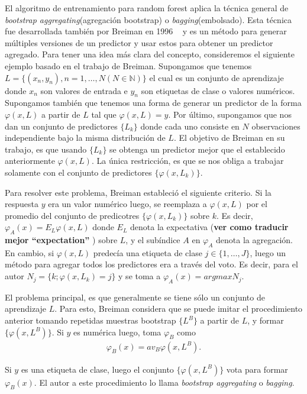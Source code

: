 	El algoritmo de entrenamiento para random forest aplica la técnica general de \textit{bootstrap aggregating}(agregación bootstrap) o \textit{bagging}(embolsado). Esta técnica fue desarrollada también por Breiman en 1996 ~\cite{LBreiman96} y es un método para generar múltiples versiones de un predictor y usar estos para obtener un predictor agregado. Para tener una idea más clara del concepto, consideremos el siguiente ejemplo basado en el trabajo de Breiman. Supongamos que tenemos $L = \{ (x_n,y_n), n = 1,\dots, N (N \in \mathbb{N}) \}$ el cual es un conjunto de aprendizaje donde $x_n$ son valores de entrada e $y_n$ son etiquetas de clase o valores numéricos. Supongamos también que tenemos una forma de generar un predictor de la forma $\varphi(x,L)$ a partir de $L$ tal que $ \varphi(x,L) = y $. Por último, supongamos que nos dan un conjunto de predictores $\{ L_k \}$ donde cada uno consiste en $N$ observaciones independiente bajo la misma distribución de $L$. El objetivo de Breiman en su trabajo, es que usando $\{ L_k \}$ se obtenga un predictor mejor que el establecido anteriormente $\varphi(x,L)$. La única restricción, es que se nos obliga a trabajar solamente con el conjunto de predictores $\{ \varphi(x, L_k)\} $.

	Para resolver este problema, Breiman estableció el siguiente
        criterio. Si la respuesta $y$ era un valor numérico luego, se reemplaza
        a $\varphi(x,L)$ por el promedio del conjunto de predicotres $ \{
        \varphi(x, L_k)\} $ sobre $k$. Es decir, $\varphi_A(x) =
        E_L\varphi(x,L)$ donde $E_L$ denota la expectativa (\textbf{ver como
          traducir mejor ``expectation''} ) sobre $L$, y el subíndice $A$ en $\varphi_A$ denota la agregación. En cambio, si $ \varphi(x,L)$ predecía una etiqueta de clase $j \in \{ 1,\dots, J \} $, luego un método para agregar todos los predictores era a través del voto. Es decir, para el autor $N_j = \{ k;\varphi(x, L_k) = j \}$ y se toma a $\varphi_A(x) = argmax N_j$.

	El problema principal, es que generalmente se tiene sólo un conjunto de aprendizaje $L$. Para esto, Breiman considera que se puede imitar el procedimiento anterior tomando repetidas muestras bootstrap $\{ L^{B} \}$ a partir de $L$, y formar $\{ \varphi(x, L^{B}) \}$. Si $y$ es numérica luego, toma $\varphi_B$ como
	\begin{align*}
		\varphi_B(x) = av_B\varphi(x,L^{B}).
	\end{align*}

	Si $y$ es una etiqueta de clase, luego el conjunto  $\{ \varphi(x, L^{B}) \}$ vota para formar $\varphi_B(x)$. El autor a este procedimiento lo llama  \textit{bootstrap aggregating} o \textit{bagging}.

